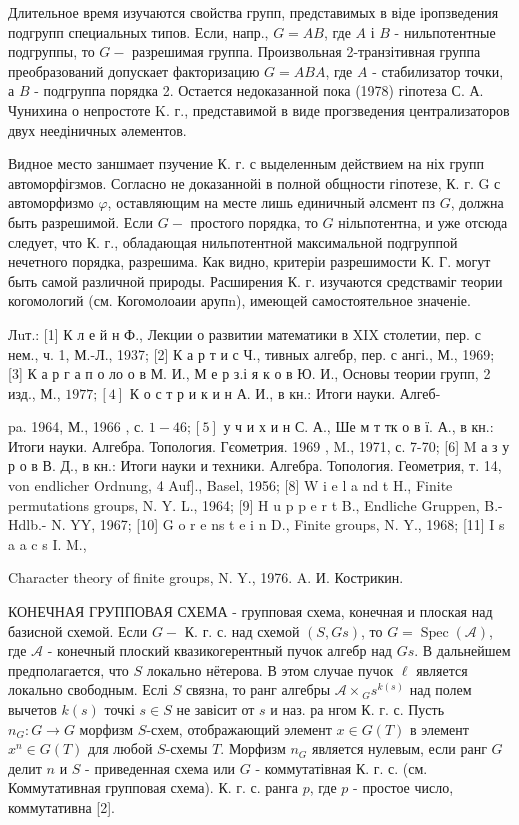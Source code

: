 \documentclass[10pt]{article}
\begin{document}
Длительное время изучаются свойства групп, представимых в віде іропзведения подгрупп специальных типов. Если, напр., $G=A B$, где $A$ і $B$ - нильпотентные подгруппы, то $G-$ разрешимая группа. Произвольная 2-транзітивная группа преобразований допускает факторизацию $G=A B A$, где $A$ - стабилизатор точки, а $B$ - подгруппа порядка 2. Остается недоказанной пока (1978) гіпотеза С. А. Чунихина о непростоте K. г., представимой в виде прогзведения централизаторов двух неедіничных әлементов.



Видное место заншмает пзучение К. г. с выделенным действием на ніх групп автоморфігзмов. Согласно не доказаннойі в полной общности гіпотезе, К. г. G с автоморфизмо $\varphi$, оставляющим на месте лишь единичный әлсмент пз $G$, должна быть разрешимой. Если $G-$ простого порядка, то $G$ нільпотентна, и уже отсюда следует, что К. г., обладающая нильпотентной максимальной подгруппой нечетного порядка, разрешима. Как видно, критеріи разрешимости К. Г. могут быть самой различной природы. Расширения К. г. изучаются средстваміг теории когомологий (см. Когомолоаии арупn), имеющей самостоятельное значеніе.



Лuт.: [1] К л е й н Ф., Лекции о развитии математики в XIX столетии, пер. с нем., ч. 1, М.-Л., 1937; [2] К а р т и с Ч., тивных алгебр, пер. с ангі., М., 1969; [3] К а р г а п о ло о в М. И., М е р з.і я к о в Ю. И., Основы теории групп, 2 изд., М., $1977 ;[4]$ К о с т р и к и н А. И., в кн.: Итоги науки. Алгеб-

pa. 1964, М., 1966 , с. $1-46 ;[5]$ у ч и х и н С. А., Ше м т тк о в ї. А., в кн.: Итоги науки. Алгебра. Топология. Гєометрия. 1969 , M., 1971, с. 7-70; [6] M а з у р о в В. Д., в кн.: Итоги науки и техники. Алгебра. Топология. Геометрия, т. 14, von endlicher Ordnung, 4 Auf]., Basel, 1956; [8] W i e l a nd t H., Finite permutations groups, N. Y. L., 1964; [9] H u p p e r t B., Endliche Gruppen, B.- Hdlb.- N. YY, 1967; [10] G o r e ns t e i n D., Finite groups, N. Y., 1968; [11] I s a a c s I. M.,

Character theory of finite groups, N. Y., 1976. A. И. Кострикин.



КОНЕЧНАЯ ГРУППОВАЯ СХЕМА - групповая схема, конечная и плоская над базисной схемой. Если $G-$ К. г. с. над схемой $(S, G s)$, то $G=\operatorname{Spec}(\mathcal{A})$, где $\mathcal{A}$ - конечный плоский квазикогерентный пучок алгебр над $G s$. В дальнейшем предполагается, что $S$ локально нётерова. В этом случае пучок $\mathcal{\ell}$ является локально свободным. Еслі $S$ связна, то ранг алгебры $\mathcal{A} \times{ }_{G} s^{k(s)}$ над полем вычетов $k(s)$ точкі $s \in S$ не завісит от $s$ и наз. ра нгом К. г. с. Пусть $n_{G}: G \rightarrow G$ морфизм $S$-схем, отображающий элемент $x \in G(T)$ в элемент $x^{n} \in G(T)$ для любой $S$-схемы $T$. Морфизм $n_{G}$ является нулевым, если ранг $G$ делит $n$ и $S$ - приведенная схема или $G$ - коммутатівная К. г. с. (см. Коммутативная групповая схема). К. г. с. ранга $p$, где $p$ - простое число, коммутативна [2].
\end{document}
